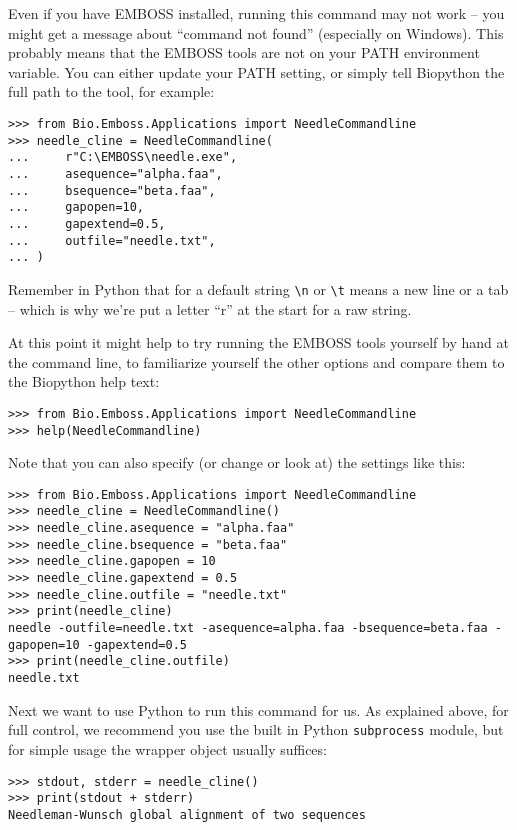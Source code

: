 Even if you have EMBOSS installed, running this command may not work -- you
might get a message about ``command not found'' (especially on Windows). This
probably means that the EMBOSS tools are not on your PATH environment
variable. You can either update your PATH setting, or simply tell Biopython
the full path to the tool, for example:

\begin{verbatim}
>>> from Bio.Emboss.Applications import NeedleCommandline
>>> needle_cline = NeedleCommandline(
...     r"C:\EMBOSS\needle.exe",
...     asequence="alpha.faa",
...     bsequence="beta.faa",
...     gapopen=10,
...     gapextend=0.5,
...     outfile="needle.txt",
... )
\end{verbatim}

\noindent Remember in Python that for a default string \verb|\n| or \verb|\t| means a
new line or a tab -- which is why we're put a letter ``r'' at the start for a raw string.

At this point it might help to try running the EMBOSS tools yourself by hand at the
command line, to familiarize yourself the other options and compare them to the
Biopython help text:

\begin{verbatim}
>>> from Bio.Emboss.Applications import NeedleCommandline
>>> help(NeedleCommandline)
\end{verbatim}

Note that you can also specify (or change or look at) the settings like this:

\begin{verbatim}
>>> from Bio.Emboss.Applications import NeedleCommandline
>>> needle_cline = NeedleCommandline()
>>> needle_cline.asequence = "alpha.faa"
>>> needle_cline.bsequence = "beta.faa"
>>> needle_cline.gapopen = 10
>>> needle_cline.gapextend = 0.5
>>> needle_cline.outfile = "needle.txt"
>>> print(needle_cline)
needle -outfile=needle.txt -asequence=alpha.faa -bsequence=beta.faa -gapopen=10 -gapextend=0.5
>>> print(needle_cline.outfile)
needle.txt
\end{verbatim}

Next we want to use Python to run this command for us. As explained above,
for full control, we recommend you use the built in Python \texttt{subprocess}
module, but for simple usage the wrapper object usually suffices:

\begin{verbatim}
>>> stdout, stderr = needle_cline()
>>> print(stdout + stderr)
Needleman-Wunsch global alignment of two sequences
\end{verbatim}

